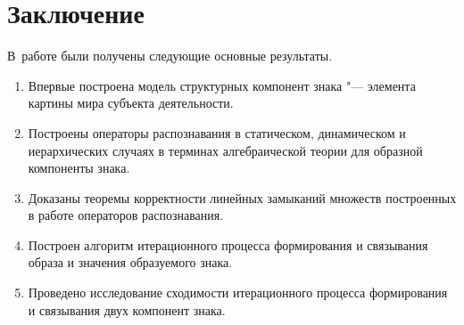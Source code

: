 \chapter*{Заключение}						%

В~работе были получены следующие основные результаты.

\begin{enumerate}
	\renewcommand\labelenumi{\theenumi.}
	\item Впервые построена модель структурных компонент знака "--- элемента картины мира субъекта деятельности.
	\item Построены операторы распознавания в статическом, динамическом и иерархических случаях в терминах алгебраической теории для образной компоненты знака.
	\item Доказаны теоремы корректности линейных замыканий множеств построенных в работе операторов распознавания.
	\item Построен алгоритм итерационного процесса формирования и связывания образа и значения образуемого знака.
	\item Проведено исследование сходимости итерационного процесса формирования и связывания двух компонент знака.
\end{enumerate}

\clearpage